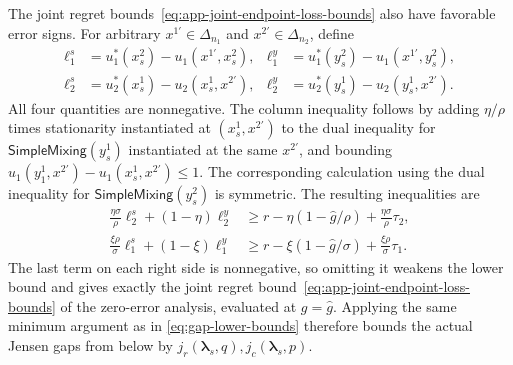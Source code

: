 \documentclass[11pt]{article}
\theoremstyle{remark}
\theoremstyle{plain}
\newcommand{\sm}{\mathsf{SimpleMixing}}
\begin{document}
The joint regret bounds~\eqref{eq:app-joint-endpoint-loss-bounds}
also have favorable error signs.
For arbitrary $x^{1\prime}\in\Delta_{n_1}$ and
$x^{2\prime}\in\Delta_{n_2}$, define
\begin{equation}
 \begin{aligned}
 \ell_1^s&=u_1^*(x_s^2)-u_1(x^{1\prime},x_s^2),&
 \ell_1^y&=u_1^*(y_s^2)-u_1(x^{1\prime},y_s^2),\\
 \ell_2^s&=u_2^*(x_s^1)-u_2(x_s^1,x^{2\prime}),&
 \ell_2^y&=u_2^*(y_s^1)-u_2(y_s^1,x^{2\prime}).
 \end{aligned}
 \label{eq:finite-error-payoff-losses}
\end{equation}
All four quantities are nonnegative. The column inequality follows
by adding $\eta/\rho$ times stationarity instantiated at
$(x_s^1,x^{2\prime})$ to the dual inequality for $\sm(y_s^1)$
instantiated at the same $x^{2\prime}$, and bounding
$u_1(y_1^1,x^{2\prime})-u_1(x_s^1,x^{2\prime})\le1$.
The corresponding calculation using the dual inequality for
$\sm(y_s^2)$ is symmetric. The resulting inequalities are
\begin{equation}
 \begin{aligned}
 \frac{\eta\sigma}{\rho}\ell_2^s+(1-\eta)\ell_2^y
 &\ge r-\eta(1-\hat g/\rho)+\frac{\eta\sigma}{\rho}\tau_2,\\
 \frac{\xi\rho}{\sigma}\ell_1^s+(1-\xi)\ell_1^y
 &\ge r-\xi(1-\hat g/\sigma)+\frac{\xi\rho}{\sigma}\tau_1.
 \end{aligned}
 \label{eq:finite-error-joint-losses}
\end{equation}
The last term on each right side is nonnegative, so omitting it
weakens the lower bound and gives exactly the joint regret
bound~\eqref{eq:app-joint-endpoint-loss-bounds} of the zero-error
analysis, evaluated at $g=\hat g$.
Applying the same minimum argument as in
\eqref{eq:gap-lower-bounds} therefore bounds the actual Jensen
gaps from below by $j_r(\boldsymbol\lambda_s,q),j_c(\boldsymbol\lambda_s,p)$.
\end{document}
